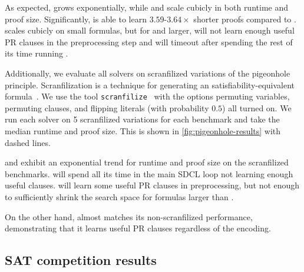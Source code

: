 As expected, \cadical grows exponentially, while \sadical and \tool scale
cubicly in both runtime and proof size. Significantly, \tool is able to learn
$3.59$-$3.64\times$ shorter proofs compared to \sadical. 
\prelearn scales cubicly on small formulas, but for  and larger, will not
learn enough useful PR clauses in the preprocessing step and will timeout after
spending the rest of its time running \cadical.

Additionally, we evaluate all solvers on scranfilized variations of the
pigeonhole principle. Scranfilization is a technique for generating an
satisfiability-equivalent formula~\cite{scranfilize}. We use the tool
\texttt{scranfilize}~\cite{scranfilize} with the options permuting variables,
permuting clauses, and flipping literals (with probability $0.5$) all turned on.
We run each solver on 5 scranfilized variations for each benchmark and take the
median runtime and proof size. This is shown in \autoref{fig:pigeonhole-results}
with dashed lines.

\sadical and \prelearn exhibit an exponential trend for runtime and proof size
on the scranfilized benchmarks. \sadical will spend all its time in the main
SDCL loop not learning enough useful clauses. \prelearn will learn some useful
PR clauses in preprocessing, but not enough to sufficiently shrink the search
space for formulas larger than .

On the other hand, \tool almost matches its non-scranfilized performance,
demonstrating that it learns useful PR clauses regardless of the encoding.

\subsection{SAT competition results}~\label{subsec:eval-satcomp}








